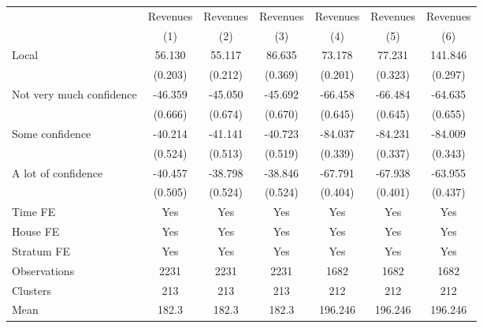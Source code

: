 {
\def\sym#1{\ifmmode^{#1}\else\(^{#1}\)\fi}
\begin{tabular}{l*{6}{c}}
\toprule
                &\multicolumn{1}{c}{Revenues}&\multicolumn{1}{c}{Revenues}&\multicolumn{1}{c}{Revenues}&\multicolumn{1}{c}{Revenues}&\multicolumn{1}{c}{Revenues}&\multicolumn{1}{c}{Revenues}\\
                &\multicolumn{1}{c}{(1)}         &\multicolumn{1}{c}{(2)}         &\multicolumn{1}{c}{(3)}         &\multicolumn{1}{c}{(4)}         &\multicolumn{1}{c}{(5)}         &\multicolumn{1}{c}{(6)}         \\
\midrule
Local           &   56.130         &   55.117         &   86.635         &   73.178         &   77.231         &  141.846         \\
                &  (0.203)         &  (0.212)         &  (0.369)         &  (0.201)         &  (0.323)         &  (0.297)         \\
Not very much confidence&  -46.359         &  -45.050         &  -45.692         &  -66.458         &  -66.484         &  -64.635         \\
                &  (0.666)         &  (0.674)         &  (0.670)         &  (0.645)         &  (0.645)         &  (0.655)         \\
Some confidence &  -40.214         &  -41.141         &  -40.723         &  -84.037         &  -84.231         &  -84.009         \\
                &  (0.524)         &  (0.513)         &  (0.519)         &  (0.339)         &  (0.337)         &  (0.343)         \\
A lot of confidence&  -40.457         &  -38.798         &  -38.846         &  -67.791         &  -67.938         &  -63.955         \\
                &  (0.505)         &  (0.524)         &  (0.524)         &  (0.404)         &  (0.401)         &  (0.437)         \\
Time FE         &      Yes         &      Yes         &      Yes         &      Yes         &      Yes         &      Yes         \\
House FE        &      Yes         &      Yes         &      Yes         &      Yes         &      Yes         &      Yes         \\
Stratum FE      &      Yes         &      Yes         &      Yes         &      Yes         &      Yes         &      Yes         \\
\midrule
Observations    &     2231         &     2231         &     2231         &     1682         &     1682         &     1682         \\
Clusters        &      213         &      213         &      213         &      212         &      212         &      212         \\
Mean            &    182.3         &    182.3         &    182.3         &  196.246         &  196.246         &  196.246         \\
\bottomrule
\end{tabular}
}
